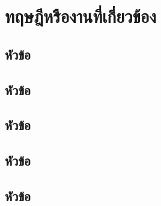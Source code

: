 \chapter{ทฤษฎีหรืองานที่เกี่ยวข้อง}
\label{chapter2}

\section{หัวข้อ}

\section{หัวข้อ}

\section{หัวข้อ}

\section{หัวข้อ}

\section{หัวข้อ}
